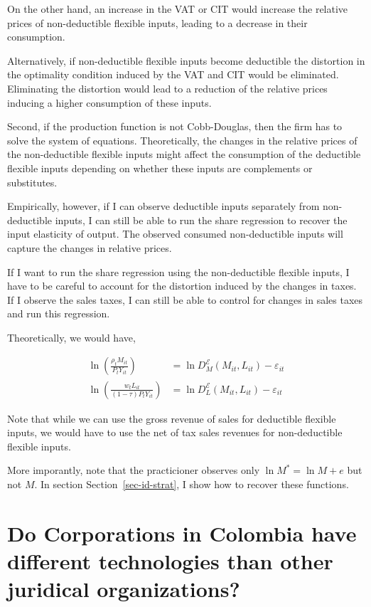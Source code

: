 \documentclass[
  12pt]{article}
\theoremstyle{definition}
\theoremstyle{remark}
\begin{document}
On the other hand, an increase in the VAT or CIT would increase the
relative prices of non-deductible flexible inputs, leading to a decrease
in their consumption.

Alternatively, if non-deductible flexible inputs become deductible the
distortion in the optimality condition induced by the VAT and CIT would
be eliminated. Eliminating the distortion would lead to a reduction of
the relative prices inducing a higher consumption of these inputs.

Second, if the production function is not Cobb-Douglas, then the firm
has to solve the system of equations. Theoretically, the changes in the
relative prices of the non-deductible flexible inputs might affect the
consumption of the deductible flexible inputs depending on whether these
inputs are complements or substitutes.

Empirically, however, if I can observe deductible inputs separately from
non-deductible inputs, I can still be able to run the share regression
to recover the input elasticity of output. The observed consumed
non-deductible inputs will capture the changes in relative prices.

If I want to run the share regression using the non-deductible flexible
inputs, I have to be careful to account for the distortion induced by
the changes in taxes. If I observe the sales taxes, I can still be able
to control for changes in sales taxes and run this regression.

Theoretically, we would have,

\[
\begin{aligned}
    \ln\left(\frac{\rho_{t}M_{it}}{P_tY_{it}}\right)&=\ln D^{\mathcal{E}}_M(M_{it}, L_{it})-\varepsilon_{it} \\
    \ln\left(\frac{w_{t}L_{it}}{(1-\tau)P_tY_{it}}\right)&=\ln D^{\mathcal{E}}_L(M_{it}, L_{it})-\varepsilon_{it}
\end{aligned}
\]

Note that while we can use the gross revenue of sales for deductible
flexible inputs, we would have to use the net of tax sales revenues for
non-deductible flexible inputs.

More imporantly, note that the practicioner observes only
\(\ln M^*=\ln M+e\) but not \(M\). In section
Section~\ref{sec-id-strat}, I show how to recover these functions.

\section{Do Corporations in Colombia have different technologies than
other juridical
organizations?}\label{do-corporations-in-colombia-have-different-technologies-than-other-juridical-organizations}
\end{document}
